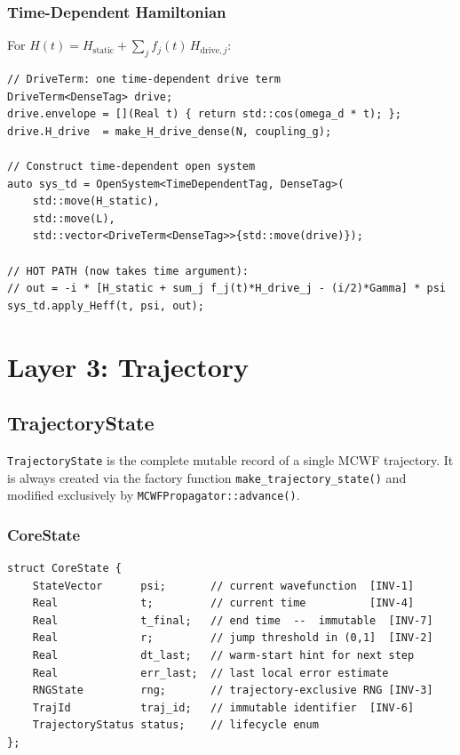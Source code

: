 \documentclass[11pt,a4paper,twoside]{book}
\newcommand{\code}[1]{\texttt{\small#1}}
\theoremstyle{definition}
\theoremstyle{remark}
\begin{document}
\subsection{Time-Dependent Hamiltonian}
\label{subsec:opensystem-timedep}

For $H(t) = H_{\mathrm{static}} + \sum_j f_j(t)\,H_{\mathrm{drive},j}$:

\begin{verbatim}
// DriveTerm: one time-dependent drive term
DriveTerm<DenseTag> drive;
drive.envelope = [](Real t) { return std::cos(omega_d * t); };
drive.H_drive  = make_H_drive_dense(N, coupling_g);

// Construct time-dependent open system
auto sys_td = OpenSystem<TimeDependentTag, DenseTag>(
    std::move(H_static),
    std::move(L),
    std::vector<DriveTerm<DenseTag>>{std::move(drive)});

// HOT PATH (now takes time argument):
// out = -i * [H_static + sum_j f_j(t)*H_drive_j - (i/2)*Gamma] * psi
sys_td.apply_Heff(t, psi, out);
\end{verbatim}

\chapter{Layer 3: Trajectory}
\label{chap:trajectory}

\section{TrajectoryState}
\label{sec:trajectory-state}

\code{TrajectoryState} is the complete mutable record of a single
MCWF trajectory. It is always created via the factory function
\code{make\_trajectory\_state()} and modified exclusively by
\code{MCWFPropagator::advance()}.

\subsection{CoreState}
\label{subsec:corestate}

\begin{verbatim}
struct CoreState {
    StateVector      psi;       // current wavefunction  [INV-1]
    Real             t;         // current time          [INV-4]
    Real             t_final;   // end time  --  immutable  [INV-7]
    Real             r;         // jump threshold in (0,1]  [INV-2]
    Real             dt_last;   // warm-start hint for next step
    Real             err_last;  // last local error estimate
    RNGState         rng;       // trajectory-exclusive RNG [INV-3]
    TrajId           traj_id;   // immutable identifier  [INV-6]
    TrajectoryStatus status;    // lifecycle enum
};
\end{verbatim}
\end{document}
